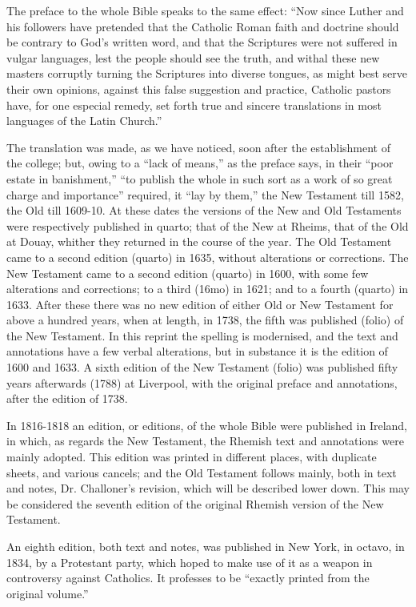 The preface to the whole Bible speaks to the same effect: ``Now
since Luther and his followers have pretended that the Catholic Roman
faith and doctrine should be contrary to God's written word, and that
the Scriptures were not suffered in vulgar languages, lest the people
should see the truth, and withal these new masters corruptly turning
the Scriptures into diverse tongues, as might best serve their own
opinions, against this false suggestion and practice, Catholic pastors
have, for one especial remedy, set forth true and sincere translations
in most languages of the Latin Church.''

The translation was made, as we have noticed, soon after the
establishment of the college; but, owing to a ``lack of
means,'' as the preface says, in their ``poor estate in
banishment,'' ``to publish the whole in such sort as a
work of so great charge and importance'' required, it ``lay by
them,'' the New Testament till 1582, the Old till 1609-10. At
these dates the versions of the New and Old Testaments were
respectively published in quarto; that of the New at Rheims, that of
the Old at Douay, whither they returned in the course of the year. The
Old Testament came to a second edition (quarto) in 1635, without
alterations or corrections. The New Testament came to a second edition
(quarto) in 1600, with some few alterations and corrections; to a
third (16mo) in 1621; and to a fourth (quarto) in 1633. After these
there was no new edition of either Old or New Testament for above a
hundred years, when at length, in 1738, the fifth was published
(folio) of the New Testament. In this reprint the spelling is
modernised, and the text and annotations have a few verbal
alterations, but in substance it is the edition of 1600 and 1633. A
sixth edition of the New Testament (folio) was published fifty years
afterwards (1788) at Liverpool, with the original preface and
annotations, after the edition of 1738.

In 1816-1818 an edition, or editions, of the whole Bible were
published in Ireland, in which, as regards the New Testament, the
Rhemish text and annotations were mainly adopted. This edition was
printed in different places, with duplicate sheets, and various
cancels; and the Old Testament follows mainly, both in text and notes,
Dr. Challoner's revision, which will be described lower down. This may
be considered the seventh edition of the original Rhemish version of
the New Testament.

An eighth edition, both text and notes, was published in New
York, in octavo, in 1834, by a Protestant party, which hoped to make
use of it as a weapon in controversy against Catholics. It professes
to be ``exactly printed from the original volume.''

